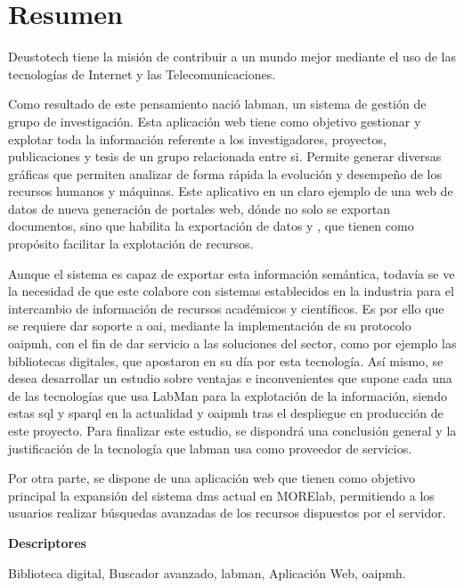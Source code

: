 \chapter*{Resumen}

Deustotech tiene la misión de contribuir a un mundo mejor mediante el uso de
las tecnologías de Internet y las Telecomunicaciones.

Como resultado de este pensamiento nació \acrshort{labman}, un sistema de gestión de grupo de investigación. Esta aplicación web tiene como objetivo gestionar y explotar toda la información referente a los investigadores, proyectos, publicaciones y tesis de un grupo relacionada entre si. Permite 
generar diversas gráficas que permiten analizar de forma rápida la evolución y desempeño de los recursos humanos y máquinas.
Este aplicativo en un claro ejemplo de una web de datos de nueva generación de portales web, dónde
no solo se exportan documentos, sino que habilita la exportación de datos y , que
tienen como propósito facilitar la explotación de recursos.

Aunque el sistema es capaz de exportar esta información semántica, todavía se ve la necesidad de que este colabore con sistemas establecidos en la industria para el intercambio de información de recursos académicos y científicos.
Es por ello que se requiere dar soporte a \acrshort{oai}, mediante la implementación de su protocolo \acrshort{oaipmh}, con el fin de dar servicio a las soluciones del sector, como por ejemplo las bibliotecas digitales, que apostaron en su día por esta tecnología. Así mismo, se desea desarrollar un estudio sobre ventajas e inconvenientes que supone cada una de las tecnologías que usa LabMan para la explotación de la información, siendo estas \acrshort{sql} y \acrshort{sparql} en la actualidad y \acrshort{oaipmh} tras el despliegue en producción de este proyecto. Para finalizar este estudio, se dispondrá una conclusión general y la justificación de la tecnología que \acrshort{labman} usa como proveedor de servicios.

Por otra parte, se dispone de una aplicación web que tienen como objetivo principal la expansión
del sistema \acrshort{dms} actual en MORElab, permitiendo a los usuarios realizar búsquedas avanzadas de los recursos dispuestos por el servidor.

\vspace{2em}

{\Large\bfseries\sffamily Descriptores}
\vspace{3\medskipamount}

Biblioteca digital, Buscador avanzado, \acrshort{labman}, Aplicación Web, \acrshort{oaipmh}.